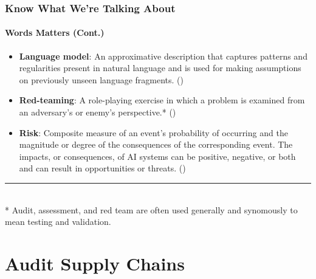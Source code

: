 \documentclass[11pt,
               aspectratio=169,
               hyperref={colorlinks}
               ]{beamer}
\begin{document}
		\begin{frame}
			
			\frametitle{Know What We're Talking About}
			\framesubtitle{Words Matters (Cont.)}
			
			\begin{itemize}
				
				\item \textbf{Language model}: An approximative description that captures patterns and regularities present in natural language and is used for making assumptions on previously unseen language fragments. (\cite{atherton2023language})

				\item \textbf{Red-teaming}: A role-playing exercise in which a problem is examined from an adversary’s or enemy’s perspective.* (\cite{atherton2023language})

				
				\item \textbf{Risk}: Composite measure of an event’s probability of occurring and the magnitude or degree of the consequences of the corresponding event. The impacts, or consequences, of AI systems can be positive, negative, or both and can result in opportunities or threats. (\cite{atherton2023language})

			\end{itemize}
			
			\vspace{10pt}
			\par\noindent\rule{100pt}{0.4pt}\\
			\vspace{5pt}
			\scriptsize{* Audit, assessment, and red team are often used generally and synomously to mean testing and validation.}
		
		\end{frame}




	\section{Audit Supply Chains}
\end{document}
